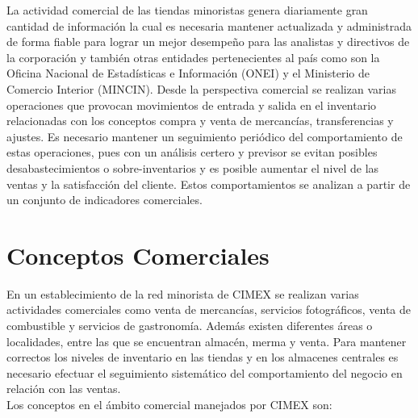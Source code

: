 
La actividad comercial de las tiendas minoristas genera diariamente gran cantidad de información la cual es necesaria mantener actualizada y administrada de forma fiable para lograr un mejor desempeño para las analistas y directivos de la corporación y también otras entidades pertenecientes al país como son la Oficina Nacional de Estadísticas e Información (ONEI) y el Ministerio de Comercio Interior (MINCIN). Desde la perspectiva comercial se realizan varias operaciones que provocan movimientos de entrada y salida en el inventario relacionadas con los conceptos compra y venta de mercancías, transferencias y ajustes. Es necesario mantener un seguimiento periódico del comportamiento de estas operaciones, pues con un análisis certero y previsor se evitan posibles desabastecimientos o sobre-inventarios y es posible aumentar el nivel de las ventas y la satisfacción del cliente. Estos comportamientos se analizan a partir de un conjunto de indicadores comerciales.


\section*{Conceptos Comerciales}\label{concepto_comercial}
En un establecimiento de la red minorista de CIMEX se realizan varias actividades comerciales como venta de mercancías, servicios fotográficos, venta de combustible y servicios de gastronomía. Además existen diferentes áreas o localidades, entre las que se encuentran almacén, merma y venta. Para mantener correctos los niveles de inventario en las tiendas y en los almacenes centrales es necesario efectuar el seguimiento sistemático del comportamiento del negocio en relación con las ventas.\\

Los conceptos en el ámbito comercial manejados por CIMEX son:

